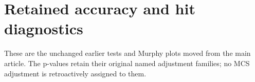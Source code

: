 \section{Retained accuracy and hit diagnostics}\label{sup:v10-diagnostics}
These are the unchanged earlier tests and Murphy plots moved from the main article. The p-values retain their original named adjustment families; no MCS adjustment is retroactively assigned to them.



